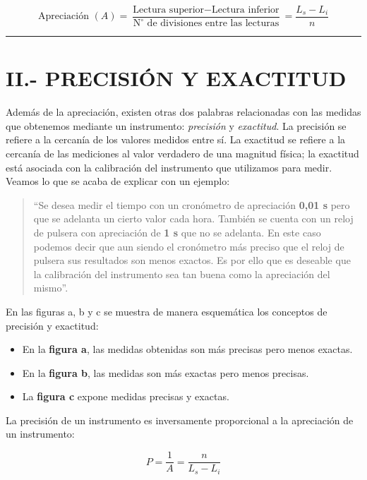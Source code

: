 \documentclass[12pt,a4paper]{article}
\begin{document}
\begin{equation}
\text{Apreciación } (A) = \frac{\text{Lectura superior} - \text{Lectura inferior}}{\text{N}^\circ \text{ de divisiones entre las lecturas}} = \frac{L_s - L_i}{n} \tag{1}
\end{equation}

\vspace{0.5cm}
\hrule
\vspace{0.5cm}

\section{II.- PRECISIÓN Y EXACTITUD}

Además de la apreciación, existen otras dos palabras relacionadas con las medidas que obtenemos mediante un instrumento: \textit{precisión} y \textit{exactitud}. La precisión se refiere a la cercanía de los valores medidos entre sí. La exactitud se refiere a la cercanía de las mediciones al valor verdadero de una magnitud física; la exactitud está asociada con la calibración del instrumento que utilizamos para medir. Veamos lo que se acaba de explicar con un ejemplo:

\begin{quote}
``Se desea medir el tiempo con un cronómetro de apreciación \textbf{0,01 s} pero que se adelanta un cierto valor cada hora. También se cuenta con un reloj de pulsera con apreciación de \textbf{1 s} que no se adelanta. En este caso podemos decir que aun siendo el cronómetro más preciso que el reloj de pulsera sus resultados son menos exactos. Es por ello que es deseable que la calibración del instrumento sea tan buena como la apreciación del mismo''.
\end{quote}

En las figuras a, b y c se muestra de manera esquemática los conceptos de precisión y exactitud:
\begin{itemize}
    \item En la \textbf{figura a}, las medidas obtenidas son más precisas pero menos exactas.
    \item En la \textbf{figura b}, las medidas son más exactas pero menos precisas.
    \item La \textbf{figura c} expone medidas precisas y exactas.
\end{itemize}

La precisión de un instrumento es inversamente proporcional a la apreciación de un instrumento:

\begin{equation}
P = \frac{1}{A} = \frac{n}{L_s - L_i} \tag{2}
\end{equation}
\end{document}
